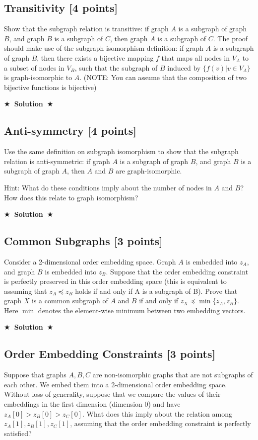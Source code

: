 \documentclass[11pt]{article}
\numberwithin{figure}{section}
\newcommand{\Solution}[1]{{\medskip \color{red} \bf $\bigstar$~\sf \textbf{Solution}~$\bigstar$ \sf #1 } \bigskip}
\begin{document}
\subsection{Transitivity [4 points]}
Show that the subgraph relation is transitive: if graph $A$ is a subgraph of graph $B$, and graph $B$ is a subgraph of $C$, then graph $A$ is a subgraph of $C$. The proof should make use of the subgraph isomorphism definition: if graph $A$ is a subgraph of graph $B$, then there exists a bijective mapping $f$ that maps all nodes in $V_A$ to a subset of nodes in $V_B$, such that the subgraph of $B$ induced by $\{f(v)|v \in V_A\}$ is graph-isomorphic to $A$. (NOTE: You can assume that the composition of two bijective functions is bijective)

\Solution{}

\subsection{Anti-symmetry [4 points]}
Use the same definition on subgraph isomorphism to show that the subgraph relation is anti-symmetric: if graph $A$ is a subgraph of graph $B$, and graph $B$ is a subgraph of graph $A$, then $A$ and $B$ are graph-isomorphic.

Hint: What do these conditions imply about the number of nodes in $A$ and $B$? How does this relate to graph isomorphism?

\Solution{}

\subsection{Common Subgraphs [3 points]}
Consider a 2-dimensional order embedding space. Graph $A$ is embedded into $z_A$, and graph $B$ is embedded into $z_B$. Suppose that the order embedding constraint is perfectly preserved in this order embedding space (this is equivalent to assuming that $z_A \preccurlyeq z_B$ holds if and only if A is a subgraph of B). Prove that graph $X$ is a common subgraph of $A$ and $B$ if and only if $z_X \preccurlyeq \min\{z_A, z_B\}$. Here $\min$ denotes the element-wise minimum between two embedding vectors.

\Solution{}

\subsection{Order Embedding Constraints [3 points]}
Suppose that graphs $A,B,C$ are non-isomorphic graphs that are not subgraphs of each other. We embed them into a 2-dimensional order embedding space. Without loss of generality, suppose that we compare the values of their embeddings in the first dimension (dimension 0) and have $z_A[0] > z_B[0] > z_C[0]$. What does this imply about the relation among $z_A[1],z_B[1],z_C[1]$, assuming that the order embedding constraint is perfectly satisfied?
\end{document}
